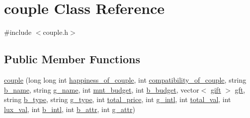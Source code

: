 \hypertarget{classcouple}{}\section{couple Class Reference}
\label{classcouple}


{\ttfamily \#include $<$couple.\+h$>$}

\subsection*{Public Member Functions}
\begin{DoxyCompactItemize}
\item 
\hyperlink{classcouple_a44e38e9c0a12f8eaf33d538e736a0d65}{couple} (long long int \hyperlink{classcouple_a6f5f14c94d6a5a49714a5fff65f64cbf}{happiness\+\_\+of\+\_\+couple}, int \hyperlink{classcouple_a24e7fa900a50df33f3acd1a834a0a3bc}{compatibility\+\_\+of\+\_\+couple}, string \hyperlink{classcouple_a6b3c95b7bfa78735cf993324eced3655}{b\+\_\+name}, string \hyperlink{classcouple_a83504092da15c4e3944a98de5898831c}{g\+\_\+name}, int \hyperlink{classcouple_a1f8e27a6a1dfc8b9555c81d9a1d17741}{mnt\+\_\+budget}, int \hyperlink{classcouple_a2542852754ebeafb8c736b1e27ddda88}{b\+\_\+budget}, vector$<$ \hyperlink{classgift}{gift} $>$ \hyperlink{classcouple_ad96c4fee691c9554eef4d04b7c0256eb}{gft}, string \hyperlink{classcouple_a5488ccb8675f26a7130f2cdf63c445de}{b\+\_\+type}, string \hyperlink{classcouple_a591de2e782415686dd757b0b6a9f5058}{g\+\_\+type}, int \hyperlink{classcouple_a2f952dd595fe1b36047cede289a91f77}{total\+\_\+price}, int \hyperlink{classcouple_a838bdf34fd51d042238ce76588536ed2}{g\+\_\+intl}, int \hyperlink{classcouple_a3624df5a498ec1b985f06f53fd3853bf}{total\+\_\+val}, int \hyperlink{classcouple_acccc6fc5885997464ab7716eafa90331}{lux\+\_\+val}, int \hyperlink{classcouple_ad5b5aadb8e89829fdc5a8e7921f29cba}{b\+\_\+intl}, int \hyperlink{classcouple_a3d7d2ed58512c33ca7eacec507d958b1}{b\+\_\+attr}, int \hyperlink{classcouple_a75407f4baf081f692829f4277106eaca}{g\+\_\+attr})
\end{DoxyCompactItemize}

